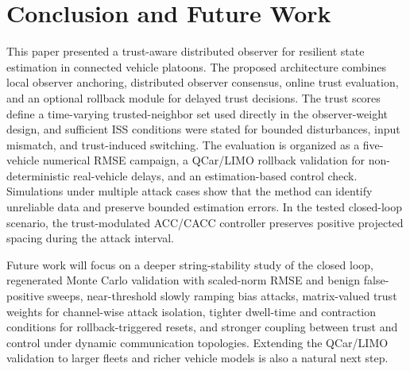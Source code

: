 \documentclass[letterpaper,journal]{IEEEtran}
\begin{document}
\section{Conclusion and Future Work}\label{sec_conclusion}
This paper presented a trust-aware distributed observer for resilient state estimation in connected vehicle platoons. The proposed architecture combines local observer anchoring, distributed observer consensus, online trust evaluation, and an optional rollback module for delayed trust decisions. The trust scores define a time-varying trusted-neighbor set used directly in the observer-weight design, and sufficient ISS conditions were stated for bounded disturbances, input mismatch, and trust-induced switching. The evaluation is organized as a five-vehicle numerical RMSE campaign, a QCar/LIMO rollback validation for non-deterministic real-vehicle delays, and an estimation-based control check. Simulations under multiple attack cases show that the method can identify unreliable data and preserve bounded estimation errors. In the tested closed-loop scenario, the trust-modulated ACC/CACC controller preserves positive projected spacing during the attack interval.

Future work will focus on a deeper string-stability study of the closed loop, regenerated Monte Carlo validation with scaled-norm RMSE and benign false-positive sweeps, near-threshold slowly ramping bias attacks, matrix-valued trust weights for channel-wise attack isolation, tighter dwell-time and contraction conditions for rollback-triggered resets, and stronger coupling between trust and control under dynamic communication topologies. Extending the QCar/LIMO validation to larger fleets and richer vehicle models is also a natural next step.



\end{document}
